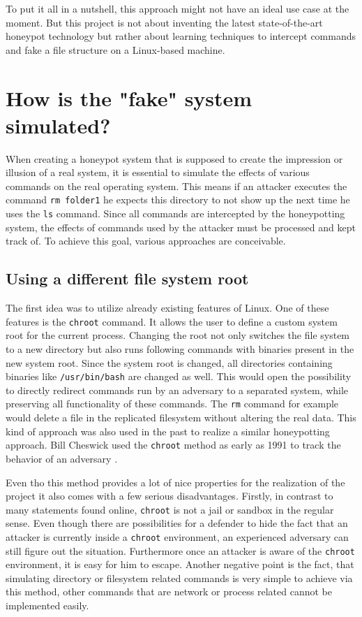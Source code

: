 To put it all in a nutshell, this approach might not have an ideal use case at the moment. But this project is not about inventing the latest state-of-the-art honeypot technology but rather about learning techniques to intercept commands and fake a file structure on a Linux-based machine.

\section{How is the "fake" system simulated?}
When creating a honeypot system that is supposed to create the impression or illusion of a real system, it is essential to simulate the effects of various commands on the real operating system.
This means if an attacker executes the command \texttt{rm folder1} he expects this directory to not show up the next time he uses the \texttt{ls} command.
Since all commands are intercepted by the honeypotting system, the effects of commands used by the attacker must be processed and kept track of.
To achieve this goal, various approaches are conceivable.

\subsection{Using a different file system root}
The first idea was to utilize already existing features of Linux.
One of these features is the \texttt{chroot} command.
It allows the user to define a custom system root for the current process.
Changing the root not only switches the file system to a new directory but also runs following commands with binaries present in the new system root.
Since the system root is changed, all directories containing binaries like \texttt{/usr/bin/bash} are changed as well.
This would open the possibility to directly redirect commands run by an adversary to a separated system, while preserving all functionality of these commands.
The \texttt{rm} command for example would delete a file in the replicated filesystem without altering the real data.
This kind of approach was also used in the past to realize a similar honeypotting approach.
Bill Cheswick used the \texttt{chroot} method as early as 1991 to track the behavior of an adversary \cite{cheswick1992evening}.

Even tho this method provides a lot of nice properties for the realization of the project it also comes with a few serious disadvantages.
Firstly, in contrast to many statements found online, \texttt{chroot} is not a jail or sandbox in the regular sense.
Even though there are possibilities for a defender to hide the fact that an attacker is currently inside a \texttt{chroot} environment, an experienced adversary can still figure out the situation.
Furthermore once an attacker is aware of the \texttt{chroot} environment, it is easy for him to escape.
Another negative point is the fact, that simulating directory or filesystem related commands is very simple to achieve via this method, other commands that are network or process related cannot be implemented easily.

